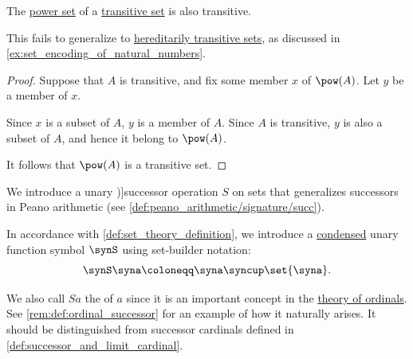 \begin{proposition}\label{thm:successor_of_power_set}
  The \hyperref[def:power_set]{power set} of a \hyperref[def:power_set]{transitive set} is also transitive.
\end{proposition}
\begin{comments}
  \item This fails to generalize to \hyperref[def:hereditarily_transitive_set]{hereditarily transitive sets}, as discussed in \cref{ex:set_encoding_of_natural_numbers}.
\end{comments}
\begin{proof}
  Suppose that \( A \) is transitive, and fix some member \( x \) of \( \pow(A) \). Let \( y \) be a member of \( x \).

  Since \( x \) is a subset of \( A \), \( y \) is a member of \( A \). Since \( A \) is transitive, \( y \) is also a subset of \( A \), and hence it belong to \( \pow(A) \).

  It follows that \( \pow(A) \) is a transitive set.
\end{proof}

\begin{definition}\label{def:ordinal_successor}
  We introduce a unary \term[ru=операция следования, en=ordinal successor (\cite[17]{Kunen2013SetTheory})]{successor} operation \( S \) on sets that generalizes successors in Peano arithmetic (see \cref{def:peano_arithmetic/signature/succ}).

  In accordance with \cref{def:set_theory_definition}, we introduce a \hyperref[def:fol_signature/notation]{condensed} unary function symbol \( {\synS} \) using set-builder notation:
  \begin{equation*}
    \synS \syna \coloneqq \syna \syncup \set{ \syna }.
  \end{equation*}
\end{definition}
\begin{comments}
  \item We also call \( Sa \) the  of \( a \) since it is an important concept in the \hyperref[sec:ordinals]{theory of ordinals}. See \cref{rem:def:ordinal_successor} for an example of how it naturally arises. It should be distinguished from successor cardinals defined in \cref{def:successor_and_limit_cardinal}.
\end{comments}

